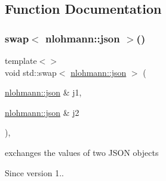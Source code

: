 \subsection{Function Documentation}
\mbox{\label{namespacestd_ace192546038d61d9c28ddfe0c3d732de}} 
\subsubsection{\texorpdfstring{swap$<$ nlohmann\+::json $>$()}{swap< nlohmann::json >()}}
{\footnotesize\ttfamily template$<$$>$ \\
void std\+::swap$<$ \hyperlink{namespacenlohmann_a2bfd99e845a2e5cd90aeaf1b1431f474}{nlohmann\+::json} $>$ (\begin{DoxyParamCaption}\item[{\hyperlink{namespacenlohmann_a2bfd99e845a2e5cd90aeaf1b1431f474}{nlohmann\+::json} \&}]{j1,  }\item[{\hyperlink{namespacenlohmann_a2bfd99e845a2e5cd90aeaf1b1431f474}{nlohmann\+::json} \&}]{j2 }\end{DoxyParamCaption})\hspace{0.3cm}{\ttfamily [inline]}, {\ttfamily [noexcept]}}



exchanges the values of two J\+S\+ON objects 

\begin{DoxySince}{Since}
version 1.. 
\end{DoxySince}
